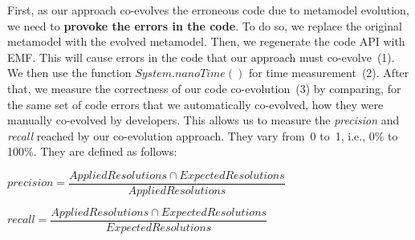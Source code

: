 	First, as our approach co-evolves the erroneous code due to metamodel evolution, we need to \textbf{provoke the errors in the code}. To do so, we replace the original metamodel with the evolved metamodel. Then, we regenerate the code API with EMF. This will cause errors in the code that our approach must co-evolve~(1).  
	We then use the function $System.nanoTime()$ for time measurement~(2). 
	After that, we measure the correctness of our code co-evolution~(3) by comparing, for the same set of code errors that we automatically co-evolved, how they were manually co-evolved by developers. This allows us to measure the \emph{precision} and \emph{recall} reached by our co-evolution approach. They vary from~0 to~1, i.e., 0\% to 100\%. They are defined as follows:
	
	
	
	\vspace{1em}
	\noindent $ precision = \dfrac{Applied Resolutions \cap Expected Resolutions}{Applied Resolutions} $
	
	\vspace{1em}
	
	\noindent $ recall = \dfrac{Applied Resolutions \cap Expected Resolutions}{Expected Resolutions} $
	\vspace{1em}
	
